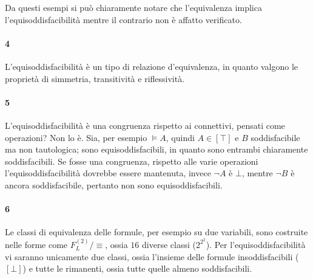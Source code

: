 Da questi esempi si può chiaramente notare che l'equivalenza implica l'equisoddisfacibilità 
mentre il contrario non è affatto verificato.

\paragraph{4}
L'equisoddisfacibilità è un tipo di relazione d'equivalenza, in quanto 
valgono le proprietà di simmetria, transitività e riflessività.
\paragraph{5} L'equisoddisfacibilità è una congruenza rispetto ai 
connettivi, pensati come operazioni? Non lo è. Sia, per esempio 
$\models A$, quindi $A \in [\top]$ e $B$ soddisfacibile ma non tautologica; 
sono equisoddisfacibili, in quanto sono entrambi chiaramente soddisfacibili. 
Se fosse una congruenza, rispetto alle varie operazioni l'equisoddisfacibilità 
dovrebbe essere mantenuta, invece $\neg A$ è $\bot$, mentre $\neg B$ è 
ancora soddisfacibile, pertanto non sono equisoddisfacibili.

\paragraph{6} Le classi di equivalenza delle formule, per esempio su 
due variabili, sono costruite nelle forme come $F_L^{(2)}/\equiv$, ossia 
$16$ diverse classi ($2^{2^2}$). Per l'equisoddisfacibilità vi saranno unicamente 
due classi, ossia l'insieme delle formule insoddisfacibili ($[\bot]$) e 
tutte le rimanenti, ossia tutte quelle almeno soddisfacibili.  


